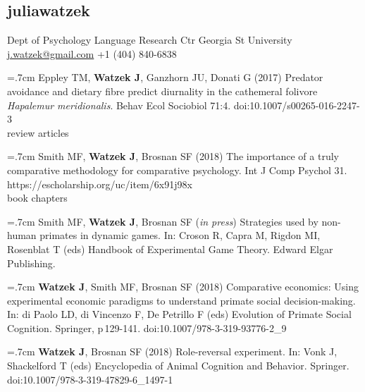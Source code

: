 \documentclass[]{friggeri-cv}
\begin{document}
\begin{aside}
  \section{{\normalfont julia}watzek}
    Dept of Psychology
    Language Research Ctr
    Georgia St University
    ~
    \href{mailto:j.watzek@gmail.com}{j.watzek@gmail.com}
    +1 (404) 840-6838
\end{aside}

\hangindent=.7cm Eppley TM, \textbf{Watzek J}, Ganzhorn JU, Donati G (2017) Predator avoidance and dietary fibre predict diurnality in the cathemeral folivore \emph{Hapalemur meridionalis}. Behav Ecol Sociobiol 71:4. doi:10.1007/s00265-016-2247-3 \\[.5cm]


{\subfont\large{} review articles}

\hangindent=.7cm Smith MF, \textbf{Watzek J}, Brosnan SF (2018) The importance of a truly comparative methodology for comparative psychology. Int J Comp Psychol 31. https://escholarship.org/uc/item/6x91j98x \\[.5cm]


{\subfont\large{} book chapters}

\hangindent=.7cm Smith MF, \textbf{Watzek J}, Brosnan SF (\emph{in press}) Strategies used by non-human primates in dynamic games. In: Croson R, Capra M, Rigdon MI, Rosenblat T (eds) Handbook of Experimental Game Theory. Edward Elgar Publishing.

\hangindent=.7cm \textbf{Watzek J}, Smith MF, Brosnan SF (2018) Comparative economics: Using experimental economic paradigms to understand primate social decision-making. In: di Paolo LD, di Vincenzo F, De Petrillo F (eds) Evolution of Primate Social Cognition. Springer, p\,129-141. doi:10.1007/978-3-319-93776-2\_9

\hangindent=.7cm \textbf{Watzek J}, Brosnan SF (2018) Role-reversal experiment. In: Vonk J, Shackelford T (eds) Encyclopedia of Animal Cognition and Behavior. Springer. doi:10.1007/978-3-319-47829-6\_1497-1\\[.5cm]



\end{document}
